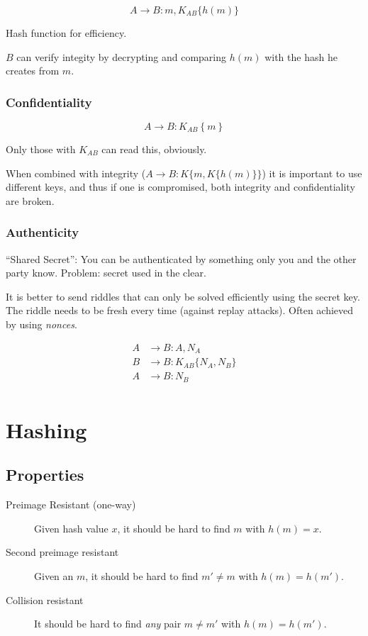 \documentclass{article}
\begin{document}
\[
  A \longrightarrow B : m, K_{AB}\{h(m)\}
\]

Hash function for efficiency.

$B$ can verify integity by decrypting and comparing $h(m)$ with the hash he
creates from $m$.

\subsubsection{Confidentiality}

\[ 
  A \longrightarrow B : K_{AB}\left\{ m \right\}
\]

Only those with $K_{AB}$ can read this, obviously.

When combined with integrity ($A \longrightarrow B : K\{m, K\{h(m)\}\}$) it is
important to use different keys, and thus if one is compromised, both integrity
and confidentiality are broken.

\subsubsection{Authenticity}

``Shared Secret'': You can be authenticated by something only you and the other
party know. Problem: secret used in the clear.

It is better to send riddles that can only be solved efficiently using the
secret key. The riddle needs to be fresh every time (against replay attacks).
Often achieved by using \emph{nonces}.

\begin{align*}
  A & \longrightarrow  B  : A, N_A             \\
  B & \longrightarrow  B : K_{AB}\{N_A, N_B\} \\
  A & \longrightarrow  B  : N_B                \\
\end{align*}

\section{Hashing}

\subsection{Properties}

\begin{description}

  \item[Preimage Resistant (one-way)] Given hash value $x$, it should be 
    hard to find $m$ with $h(m) = x$.

  \item[Second preimage resistant] Given an $m$, it should be hard to find 
    $m' \neq m$ with $h(m) = h(m')$.

  \item[Collision resistant] It should be hard to find \emph{any} pair $m \neq
    m'$ with $h(m) = h(m')$.

\end{description}
\end{document}

